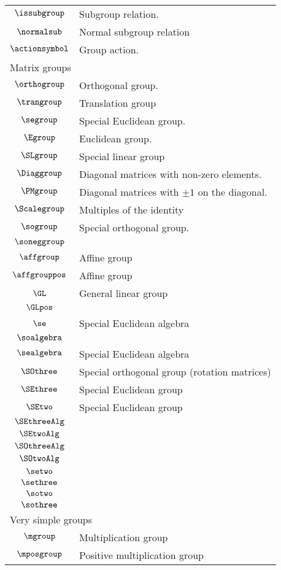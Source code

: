 \begin{longtable}{cl}
 $\issubgroup$ &  Subgroup relation.\\ 
 $\normalsub$ &  Normal subgroup relation\\ 
 $\actionsymbol$ &  Group action.\\ 
 \multicolumn{2}{l}{Matrix groups}\\ 
 \hline
$\orthogroup$ &  Orthogonal group.\\ 
 $\trangroup$ &   Translation group\\ 
 $\segroup$ &  Special Euclidean group.\\ 
 $\Egroup$ &   Euclidean group.\\ 
 $\SLgroup$ &   Special linear group\\ 
 $\Diaggroup$ &   Diagonal matrices with non-zero elements.\\ 
 $\PMgroup$ &   Diagonal matrices with $\pm 1$ on the diagonal.\\ 
 $\Scalegroup$ &   Multiples of the identity\\ 
 $\sogroup$ &  Special orthogonal group.\\ 
 $\soneggroup$ & \\ 
 $\affgroup$ &  Affine group \\ 
 $\affgrouppos$ &  Affine group \\ 
 $\GL$ &  General linear group\\ 
 $\GLpos$ &  \\ 
 $\se$ &  Special Euclidean algebra\\ 
 $\soalgebra$ & \\ 
 $\sealgebra$ &  Special Euclidean algebra\\ 
 $\SOthree$ &  Special orthogonal group (rotation matrices)\\ 
 $\SEthree$ &  Special Euclidean group \\ 
 $\SEtwo$ &  Special Euclidean group \\ 
 $\SEthreeAlg$ & \\ 
 $\SEtwoAlg$ & \\ 
 $\SOthreeAlg$ & \\ 
 $\SOtwoAlg$ & \\ 
 $\setwo$ & \\ 
 $\sethree$ & \\ 
 $\sotwo$ & \\ 
 $\sothree$ & \\ 
 \multicolumn{2}{l}{Very simple groups}\\ 
 \hline
$\mgroup$ &  Multiplication group\\ 
 $\mposgroup$ &  Positive multiplication group\\ 

\end{longtable}
